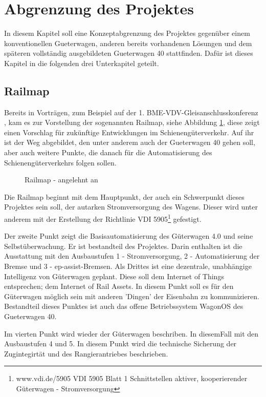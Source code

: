 \section{Abgrenzung des Projektes}
In diesem Kapitel soll eine Konzeptabgrenzung des Projektes gegenüber einem konventionellen \gls{Gueterwagen}, anderen bereits vorhandenen Lösungen und dem späteren vollständig ausgebildeten \gls{Gueterwagen 40} stattfinden. Dafür ist dieses Kapitel in die folgenden drei Unterkapitel geteilt.

\subsection{Railmap}
Bereits in Vorträgen, zum Beispiel auf der 1. BME-VDV-Gleisanschlusskonferenz \cite{GAK}, kam es zur Vorstellung der sogenannten Railmap, siehe Abbildung \ref{fig:Railmap}, diese zeigt einen Vorschlag für zukünftige Entwicklungen im Schienengüterverkehr. Auf ihr ist der Weg abgebildet, den unter anderem auch der \gls{Gueterwagen 40}  gehen soll, aber auch weitere Punkte, die danach für die Automatisierung des Schienengüterverkehrs folgen sollen.\par
\begin{figure}[hbp]
    \centering
    
    \caption{Railmap - angelehnt an \cite{GAK}}
    \label{fig:Railmap}
\end{figure}
Die Railmap beginnt mit dem Hauptpunkt, der auch ein Schwerpunkt dieses Projektes sein soll, der autarken Stromversorgung des Wagens. Dieser wird unter anderem mit der Erstellung der Richtlinie VDI 5905\footnote{www.vdi.de/5905 VDI 5905 Blatt 1 Schnittstellen aktiver, kooperierender Güterwagen - Stromversorgung} gefestigt.\par
Der zweite Punkt zeigt die Basisautomatisierung des Güterwagen 4.0 und seine Selbstüberwachung. Er ist bestandteil des Projektes. Darin enthalten ist die Ausstattung mit den Ausbaustufen 1 - Stromversorgung, 2 - Automatisierung der Bremse und 3 - \gls{ep-assist-Bremsen}.
Als Drittes ist eine dezentrale, unabhängige Intelligenz von Güterwagen geplant. Diese soll dem Internet of Things entsprechen; dem Internet of Rail Assets. In diesem Punkt soll es für den Güterwagen möglich sein mit anderen 'Dingen' der Eisenbahn zu kommunizieren. Bestandteil dieses Punktes  ist auch das offene Betriebssystem \gls{WagonOS} des \gls{Gueterwagen 40}.\par
Im vierten Punkt wird wieder der Güterwagen beschriben. In diesemFall mit den Ausbaustufen 4 und 5. In diesem Punkt wird die technische Sicherung der Zugintegirtät und des Rangierantriebes beschrieben.\par

